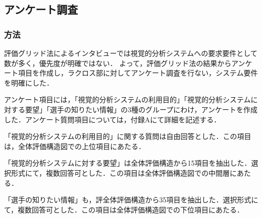 \documentclass[sotsuron]{kuee}
\begin{document}
		\subsection{アンケート調査}
			\subsubsection{方法}
				評価グリッド法によるインタビューでは視覚的分析システムへの要求要件として数が多く，優先度が明確ではない．
				よって，評価グリッド法の結果からアンケート項目を作成し，ラクロス部に対してアンケート調査を行ない，システム要件を明確にした．
				
				アンケート項目には，「視覚的分析システムの利用目的」「視覚的分析システムに対する要望」「選手の知りたい情報」の3種のグループにわけ，アンケートを作成した．アンケート質問項目については，付録Aにて詳細を記述する．

				「視覚的分析システムの利用目的」に関する質問は自由回答とした．この項目は，全体評価構造図での上位項目にあたる．

				「視覚的分析システムに対する要望」は全体評価構造から15項目を抽出した．選択形式にて，複数回答可とした．この項目は全体評価構造図での中間層にあたる．

				「選手の知りたい情報」も，評全体評価構造から35項目を抽出した．選択形式にて，複数回答可とした．この項目は全体評価構造図での下位項目にあたる．
\end{document}
